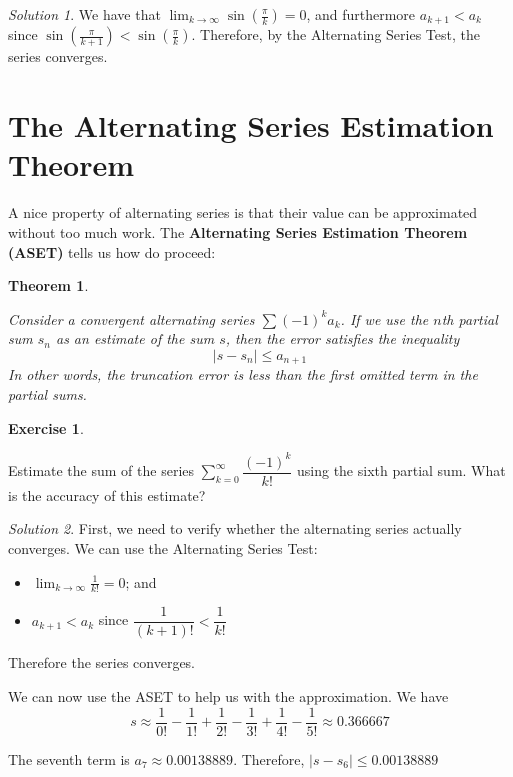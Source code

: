 \documentclass[
]{book}
\providecommand{\tightlist}{%
  \setlength{\itemsep}{0pt}\setlength{\parskip}{0pt}}
\newtheorem{theorem}{Theorem}[chapter]
\theoremstyle{definition}
\theoremstyle{definition}
\theoremstyle{definition}
\newtheorem{exercise}{Exercise}[chapter]
\theoremstyle{definition}
\theoremstyle{remark}
\newtheorem*{solution}{Solution}
\begin{document}
\begin{solution}

We have that \(\displaystyle \lim_{k\to\infty}\sin\left (\frac{\pi}{k}\right )=0\), and furthermore \(a_{k+1}<a_k\) since \(\sin\left (\frac{\pi}{k+1}\right )<\sin\left (\frac{\pi}{k}\right )\). Therefore, by the Alternating Series Test, the series converges.

\end{solution}

\hypertarget{the-alternating-series-estimation-theorem}{%
\section{The Alternating Series Estimation Theorem}\label{the-alternating-series-estimation-theorem}}

A nice property of alternating series is that their value can be approximated without too much work. The \textbf{Alternating Series Estimation Theorem (ASET)} tells us how do proceed:

\begin{theorem}
\protect\hypertarget{thm:unlabeled-div-217}{}\label{thm:unlabeled-div-217}

Consider a convergent alternating series \(\displaystyle \sum (-1)^k a_k\). If we use the \(n\)th partial sum \(s_n\) as an estimate of the sum \(s\), then the error satisfies the inequality \[|s-s_n|\leq a_{n+1}\]
In other words, the truncation error is less than the first omitted term in the partial sums.

\end{theorem}

\begin{exercise}
\protect\hypertarget{exr:unlabeled-div-218}{}\label{exr:unlabeled-div-218}

Estimate the sum of the series \(\displaystyle \sum_{k=0}^\infty \dfrac{(-1)^k}{k!}\) using the sixth partial sum. What is the accuracy of this estimate?

\end{exercise}

\begin{solution}

First, we need to verify whether the alternating series actually converges. We can use the Alternating Series Test:

\begin{itemize}
\tightlist
\item
  \(\displaystyle \lim_{k\to\infty}\frac{1}{k!}=0\); and
\item
  \(a_{k+1}<a_k\) since \(\dfrac{1}{(k+1)!}<\dfrac{1}{k!}\)
\end{itemize}

Therefore the series converges.

We can now use the ASET to help us with the approximation. We have \[s\approx \frac{1}{0!}-\frac{1}{1!}+\frac{1}{2!}-\frac{1}{3!}+\frac{1}{4!}-\frac{1}{5!} \approx 0.366667\]

The seventh term is \(a_7\approx 0.00138889\). Therefore, \(|s-s_6|\leq 0.00138889\)

\end{solution}
\end{document}

